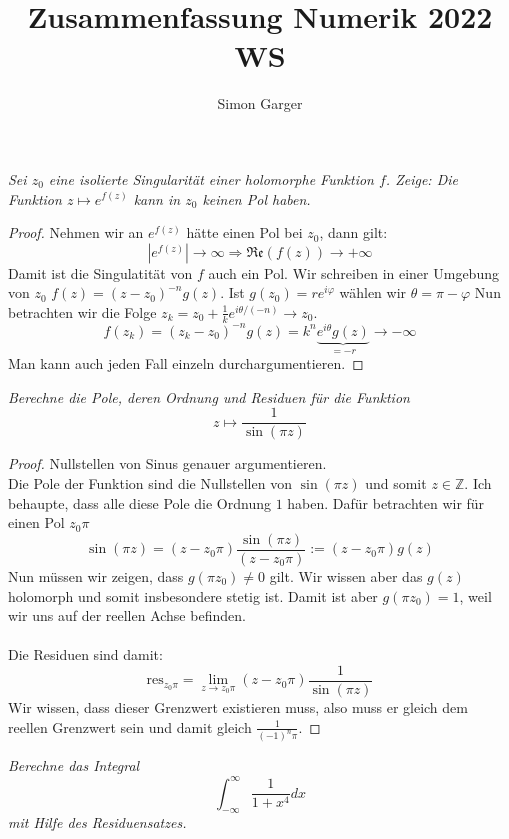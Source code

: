 \documentclass[11pt]{article}
\title{Zusammenfassung Numerik 2022 WS}
\author{Simon Garger}
\newcommand{\Z}{\mathbb{Z}}
\newcommand{\res}{\text{res}}
\renewcommand{\Re}{\mathfrak{Re}}
\newenvironment{problem}[2][Beispiel]{
    \begin{trivlist}
        \item[\hskip \labelsep {\bfseries #1}\hskip \labelsep {\bfseries #2.}] \itshape}{
    \end{trivlist}\normalshape
}
\begin{document}
    \begin{problem}{1}
        Sei $z_0$ eine isolierte Singularität einer holomorphe Funktion $f$. Zeige: Die Funktion
        $z\mapsto e^{f(z)}$ kann in $z_0$ keinen Pol haben.
    \end{problem}

    \begin{proof}
        Nehmen wir an $e^{f(z)}$ hätte einen Pol bei $z_0$, dann gilt:
        $$|e^{f(z)}|\to\infty \Rightarrow \Re(f(z))\to +\infty$$
        Damit ist die Singulatität von $f$ auch ein Pol. Wir schreiben in einer Umgebung von
        $z_0$ $f(z) = (z-z_0)^{-n}g(z)$. Ist $g(z_0)=re^{i\varphi}$ wählen wir $\theta = \pi-\varphi$
        Nun betrachten wir die Folge $z_k = z_0 +\frac{1}{k}e^{i\theta/(-n)}\to z_0$.
        $$f(z_k) = (z_k-z_0)^{-n}g(z) = k^n \underbrace{e^{i\theta }g(z)}_{=-r}\to -\infty$$
        Man kann auch jeden Fall einzeln durchargumentieren.
    \end{proof}

    \begin{problem}{2}
        Berechne die Pole, deren Ordnung und Residuen für die Funktion
        $$z\mapsto \frac{1}{\sin(\pi z)}$$
    \end{problem}

    \begin{proof}
        Nullstellen von Sinus genauer argumentieren. \\
        Die Pole der Funktion sind die Nullstellen von $\sin(\pi z)$ und somit $z\in\Z$. Ich behaupte, dass
        alle diese Pole die Ordnung $1$ haben. Dafür betrachten wir für einen Pol $z_0\pi$
        $$\sin(\pi z) = (z-z_0\pi)\frac{\sin(\pi z)}{(z-z_0\pi)}:= (z-z_0\pi) g(z)$$
        Nun müssen wir zeigen, dass $g(\pi z_0)\neq 0$ gilt. Wir wissen aber das $g(z)$ holomorph und somit
        insbesondere stetig ist. Damit ist aber $g(\pi z_0)=1$, weil wir uns auf der reellen Achse befinden.\\\\
        Die Residuen sind damit:
        $$\res_{z_0\pi} = \lim_{z\to z_0\pi} (z-z_0\pi)\frac{1}{\sin(\pi z)}$$
        Wir wissen, dass dieser Grenzwert existieren muss, also muss er gleich dem reellen Grenzwert sein und
        damit gleich $\frac{1}{(-1)^n \pi}$.
    \end{proof}

    \begin{problem}{3}
        Berechne das Integral
        $$\int_{-\infty}^\infty \frac{1}{1+x^4}dx$$
        mit Hilfe des Residuensatzes.
    \end{problem}
\end{document}
